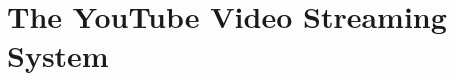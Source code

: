 

\renewcommand{\relpath}[1]{Chapters/03.DASH/Sec01/}
\graphicspath{{Chapters/03.DASH/Sec01/}}

\section{The YouTube Video Streaming System}












